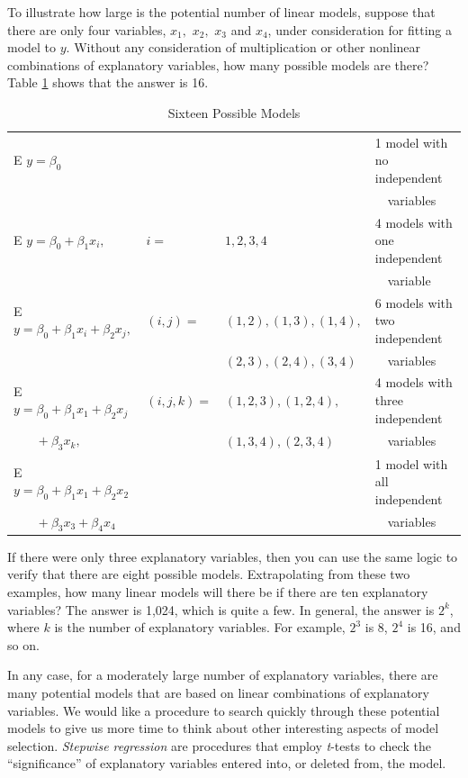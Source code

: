 To illustrate how large is the potential number of linear models,
suppose that there are only four variables, $x_{1},$ $x_2,$ $x_3$
and $x_4$, under consideration for fitting a model to $y$. Without
any consideration of multiplication or other nonlinear combinations
of explanatory variables, how many possible models are there? Table
\ref{T5:NumberModels} shows that the answer is 16.

\begin{table}[h]

\caption{\label{T5:NumberModels} Sixteen Possible Models}
\begin{tabular}{llll}
\hline
E $y=\beta_0$ &  &  & 1 model with no independent \\
&  &  & \ \ variables \\
E $y=\beta_0+\beta_1x_i,$ & $i=$ & $1,2,3,4$ & 4 models with one
independent \\
&  &  & \ \ variable \\
E $y = \beta_0 + \beta_1 x_i + \beta_2 x_j,$ & $(i,j)=$ & $
(1,2),(1,3),(1,4),$ & 6 models with two independent \\
&  & $(2,3),(2,4),(3,4)$ & \ \ variables \\
E $y = \beta_0 + \beta_1 x_1 + \beta_2 x_j$ & $(i,j,k)=$ & $
(1,2,3),(1,2,4),$ & 4 models with three independent \\
$\ \ \ \ \ \ \ \ +\beta_3x_{k},$ &  & $(1,3,4),(2,3,4)$ & \ \
variables
\\
E $y = \beta_0 + \beta_1 x_1 + \beta_2 x_2$ &  &  & 1 model with all
independent \\
$\ \ \ \ \ \ \ \ +\beta_3 x_3 + \beta_4 x_4$ &  &  & \ \ variables \\
\hline
\end{tabular}
\end{table}


\noindent If there were only three explanatory variables, then you
can use the same logic to verify that there are eight possible
models. Extrapolating from these two examples, how many linear
models will there be if there are ten explanatory variables? The
answer is 1,024, which is quite a few. In general, the answer is
$2^k$, where $k$ is the number of explanatory variables. For
example, $2^3$ is 8, $2^4$ is 16, and so on.

In any case, for a moderately large number of explanatory variables,
there are many potential models that are based on linear
combinations of explanatory variables. We would like a procedure to
search quickly through these potential models to give us more time
to think about other interesting aspects of model selection.
\textit{Stepwise regression} are procedures that employ
\textit{t}-tests to check the ``significance'' of explanatory
variables entered into, or deleted from, the model.


